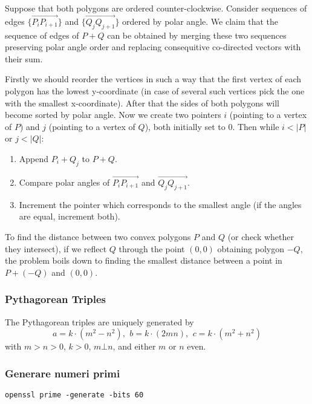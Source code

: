 Suppose that both polygons are ordered counter-clockwise. Consider sequences of edges $\{\overrightarrow{P_iP_{i+1}}\}$
and $\{\overrightarrow{Q_jQ_{j+1}}\}$ ordered by polar angle. We claim that the sequence of edges of $P + Q$ can be obtained by merging
these two sequences preserving polar angle order and replacing consequitive co-directed vectors with their sum.

Firstly we should reorder the vertices in such a way that the first vertex
of each polygon has the lowest y-coordinate (in case of several such vertices pick the one with the smallest x-coordinate). After that the sides of both polygons
will become sorted by polar angle.
Now we create two pointers $i$ (pointing to a vertex of $P$) and $j$ (pointing to a vertex of $Q$), both initially set to 0.
Then while $i < |P|$ or $j < |Q|$:
\begin{enumerate}
\item Append $P_i + Q_j$ to $P + Q$.
\item Compare polar angles of $\overrightarrow{P_iP_{i + 1}}$ and $\overrightarrow{Q_jQ_{j+1}}$.
\item Increment the pointer which corresponds to the smallest angle (if the angles are equal, increment both).
\end{enumerate}

To find the distance between two convex polygons $P$ and $Q$ (or check whether they intersect), if we reflect $Q$ through the point $(0, 0)$ obtaining polygon $-Q$, the problem boils down to finding the smallest distance between a point in
$P + (-Q)$ and $(0, 0)$.
\subsubsection{Pythagorean Triples}
 The Pythagorean triples are uniquely generated by $$a=k\cdot (m^{2}-n^{2}),\ \,b=k\cdot (2mn),\ \,c=k\cdot (m^{2}+n^{2})$$
 with $m > n > 0$, $k > 0$, $m \bot n$, and either $m$ or $n$ even.

\subsubsection{Generare numeri primi}
\begin{center}
\verb|openssl prime -generate -bits 60|
\end{center}
